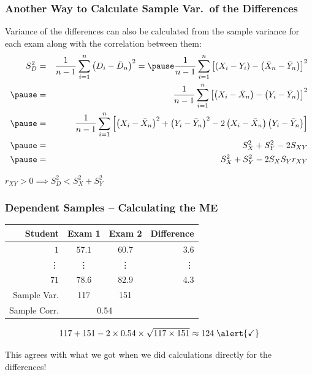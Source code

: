 \begin{frame}
\frametitle{Another Way to Calculate Sample Var.\ of the Differences}
\footnotesize
Variance of the differences can also be calculated from the sample variance for each exam along with the correlation between them:
\begin{eqnarray*}
	S_D^2&=& \frac{1}{n-1}\sum_{i=1}^n \left( D_i - \bar{D}_n\right)^2 = \pause \frac{1}{n-1}\sum_{i=1}^n \left[ \left( X_i - Y_i\right) - \left( \bar{X}_n - \bar{Y}_n\right)\right]^2\\ \pause
	&=&\frac{1}{n-1}\sum_{i=1}^n \left[ \left( X_i - \bar{X}_n\right) - \left( Y_i - \bar{Y}_n\right)\right]^2\\ \pause
	&=&\frac{1}{n-1}\sum_{i=1}^n \left[ \left( X_i - \bar{X}_n\right)^2 + \left( Y_i - \bar{Y}_n\right)^2 - 2\left(X_i - \bar{X}_n\right)\left(Y_i - \bar{Y}_n\right)\right]\\ \pause
	&=& S_X^2 + S_Y^2 - 2 S_{XY}\\ \pause
	&=& S_X^2 + S_Y^2 - 2 S_X S_Y r_{XY}
\end{eqnarray*}

\vspace{1em}
\alert{$\boxed{r_{XY} > 0 \implies S_D^2 < S_X^2 + S_Y^2}$}

\end{frame}
\begin{frame}
\frametitle{Dependent Samples -- Calculating the ME}
%
\begin{table}[!tbp]
\begin{center}
\begin{tabular}{rccr}
\hline\hline
\multicolumn{1}{r}{Student}&\multicolumn{1}{c}{Exam 1}&\multicolumn{1}{c}{Exam 2}&\multicolumn{1}{r}{Difference}\tabularnewline
\hline
$ 1$&$57.1$&$60.7$&$  3.6$\tabularnewline
\vdots&\vdots&\vdots&\vdots\\
$71$&$78.6$&$82.9$&$  4.3$\tabularnewline
\hline
Sample Var. &117  & 151 & \alert{\fbox{?}}\\
Sample Corr.& \multicolumn{2}{c}{0.54}&\\
\hline
\end{tabular}
\end{center}
\end{table}

$$117 + 151 - 2 \times 0.54 \times \sqrt{117 \times 151} \approx 124   \;\alert{\checkmark}$$

\alert{This agrees with what we got when we did calculations directly for the differences!}
\end{frame}
